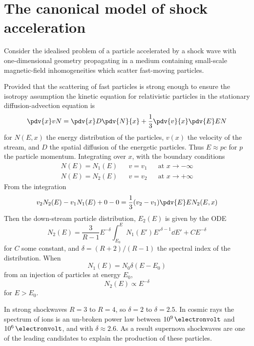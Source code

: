 \section{The canonical model of shock acceleration}
\label{sec:canon-model-shock}

Consider the idealised problem of a particle accelerated by a shock
wave with one-dimensional geometry propagating in a medium containing
small-scale magnetic-field inhomogeneities which scatter fast-moving
particles.

Provided that the scattering of fast particles is strong enough to
ensure the isotropy assumption the kinetic equation for relativistic
particles in the stationary diffusion-advection equation is
\begin{equation}
  \label{eq:87}
  \pdv{x} v N = \pdv{x} D \pdv{N}{x} + \frac{1}{3} \pdv{v}{x} \pdv{E} E N
\end{equation}
for $N(E,x)$ the energy distribution of the particles, $v(x)$ the
velocity of the stream, and $D$ the spatial diffusion of the energetic
particles. Thus $E \approx pc$ for $p$ the particle
momentum. Integrating over $x$, with the boundary conditions
\begin{align*}
  N(E)=N_1(E) && v=v_1 && \text{at } x \to - \infty\\
N(E) = N_2(E) && v=v_2 && \text{at } x \to + \infty
\end{align*}
From the integration
\[ v_2 N_2(E) - v_1 N_1(E) + 0 - 0 = \frac{1}{3} (v_2 - v_1) \pdv{E} E N_2(E,x) \]
Then the down-stream particle distribution, $E_2(E)$ is given by the ODE
\begin{equation}
  \label{eq:88}
  N_2(E) = \frac{3}{R-1} E^{-\delta} \int^E_{E_0} N_1(E') E'^{\delta-1} \dd{E'} + C E^{- \delta}
\end{equation}
for $C$ some constant, and $\delta = (R+2)/(R-1)$ the spectral index
of the distribution.  When \[N_1(E) = N_0 \delta(E-E_0) \] from an
injection of particles at energy $E_0$,
\[ N_2(E) \propto E^{-\delta} \] for $E>E_0$. 

In strong shockwaves $R = 3$ to $R=4$, so $\delta = 2$ to
$\delta=2.5$. In cosmic rays the spectrum of ions is an un-broken
power law between $10^9\,\electronvolt$ and $10^6\,\electronvolt$, and
with $\delta \approx 2.6$. As a result supernova shockwaves are one of
the leading candidates to explain the production of these particles.

